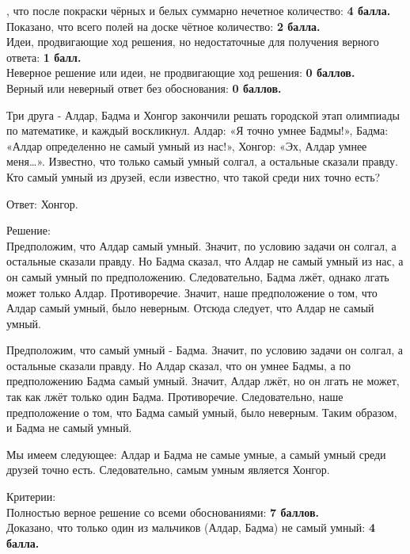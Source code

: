 \newpage

\hspace{3mm}


, что после покраски чёрных и белых суммарно нечетное количество: \textbf{4 балла.}\\
Показано, что всего полей на доске чётное количество: \textbf{2 балла.}\\
Идеи, продвигающие ход решения, но недостаточные для получения верного ответа: \textbf{1 балл.}\\
Неверное решение или идеи, не продвигающие ход решения: \textbf{0 баллов.}\\
Верный или неверный ответ без обоснования: \textbf{0 баллов.}

\hspace{3mm}

Три друга - Алдар, Бадма и Хонгор закончили решать городской этап олимпиады по математике, и каждый воскликнул. Алдар: «Я точно умнее Бадмы!», Бадма: «Алдар определенно не самый умный из нас!», Хонгор: «Эх, Алдар умнее меня…». Известно, что только самый умный солгал, а остальные сказали правду. Кто самый умный из друзей, если известно, что такой среди них точно есть?

\hspace{3mm}

Ответ: Хонгор.

Решение:\\
Предположим, что Алдар самый умный. Значит, по условию задачи он солгал, а остальные сказали правду. Но Бадма сказал, что Алдар не самый умный из нас, а он самый умный по предположению. Следовательно, Бадма лжёт, однако лгать может только Алдар. Противоречие. Значит, наше предположение о том, что Алдар самый умный, было неверным. Отсюда следует, что Алдар не самый умный. 

Предположим, что самый умный - Бадма. Значит, по условию задачи он солгал, а остальные сказали правду. Но Алдар сказал, что он умнее Бадмы, а по предположению Бадма самый умный. Значит, Алдар лжёт, но он лгать не может, так как лжёт только один Бадма. Противоречие. Следовательно, наше предположение о том, что Бадма самый умный, было неверным. Таким образом, и Бадма не самый умный.

Мы имеем следующее: Алдар и Бадма не самые умные, а самый умный среди друзей точно есть. Следовательно, самым умным является Хонгор.

\hspace{3mm}

Критерии: \\
Полностью верное решение со всеми обоснованиями: \textbf{7 баллов.}\\
Доказано, что только один из мальчиков (Алдар, Бадма) не самый умный: \textbf{4 балла.}\\

